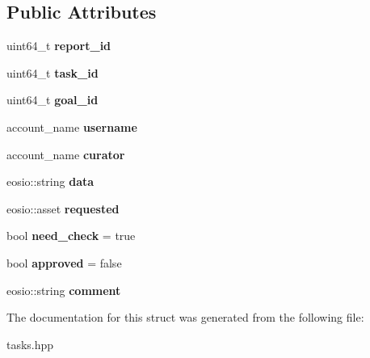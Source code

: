 \subsection*{Public Attributes}
\begin{DoxyCompactItemize}
\item 
\mbox{\label{structeosio_1_1reports_a227d788174d74251ad6333a5f81e272b}} 
uint64\+\_\+t {\bfseries report\+\_\+id}
\item 
\mbox{\label{structeosio_1_1reports_a2b944de2274c87a75d57fef17b7ae48f}} 
uint64\+\_\+t {\bfseries task\+\_\+id}
\item 
\mbox{\label{structeosio_1_1reports_a0952fb47fc6c2170ae38c8e95684449f}} 
uint64\+\_\+t {\bfseries goal\+\_\+id}
\item 
\mbox{\label{structeosio_1_1reports_a645839a5e734193117696a3b2f40f6e7}} 
account\+\_\+name {\bfseries username}
\item 
\mbox{\label{structeosio_1_1reports_a3a55fb40e7fff51439a5ecf9e399173b}} 
account\+\_\+name {\bfseries curator}
\item 
\mbox{\label{structeosio_1_1reports_ad07473f1f3cf1e8132e73a0f0fbcf5b8}} 
eosio\+::string {\bfseries data}
\item 
\mbox{\label{structeosio_1_1reports_a055750e4bdaed2e5be47fea232ba6659}} 
eosio\+::asset {\bfseries requested}
\item 
\mbox{\label{structeosio_1_1reports_a67811e8b06cfe9dae5d8de36c194b1a0}} 
bool {\bfseries need\+\_\+check} = true
\item 
\mbox{\label{structeosio_1_1reports_aeae7b2b607886f9959becd5dbc2a7e07}} 
bool {\bfseries approved} = false
\item 
\mbox{\label{structeosio_1_1reports_a492240db343e64324a64d8e8057cc503}} 
eosio\+::string {\bfseries comment}
\end{DoxyCompactItemize}


The documentation for this struct was generated from the following file\+:\begin{DoxyCompactItemize}
\item 
tasks.\+hpp\end{DoxyCompactItemize}

